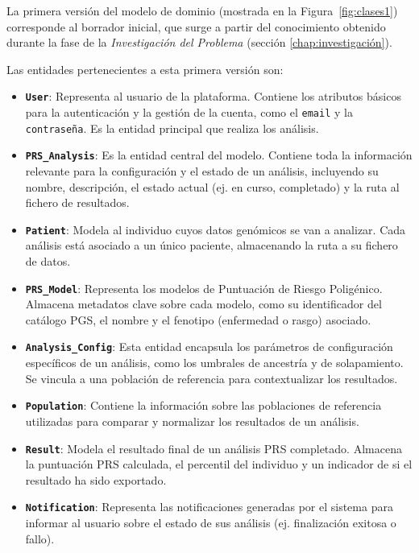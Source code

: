 La primera versión del modelo de dominio (mostrada en la Figura~\ref{fig:clases1}) corresponde al borrador inicial, que surge a partir del conocimiento obtenido durante la fase de la \textit{Investigación del Problema} (sección \ref{chap:investigación}).

Las entidades pertenecientes a esta primera versión son:  

\begin{itemize}
    \item \textbf{\texttt{User}}: Representa al usuario de la plataforma. Contiene los atributos básicos para la autenticación y la gestión de la cuenta, como el \texttt{email} y la \texttt{contraseña}. Es la entidad principal que realiza los análisis.
    
    \item \textbf{\texttt{PRS\_Analysis}}: Es la entidad central del modelo. Contiene toda la información relevante para la configuración y el estado de un análisis, incluyendo su nombre, descripción, el estado actual (ej. en curso, completado) y la ruta al fichero de resultados.
    
    \item \textbf{\texttt{Patient}}: Modela al individuo cuyos datos genómicos se van a analizar. Cada análisis está asociado a un único paciente, almacenando la ruta a su fichero de datos.
    
    \item \textbf{\texttt{PRS\_Model}}: Representa los modelos de Puntuación de Riesgo Poligénico. Almacena metadatos clave sobre cada modelo, como su identificador del catálogo PGS, el nombre y el fenotipo (enfermedad o rasgo) asociado.
    
    \item \textbf{\texttt{Analysis\_Config}}: Esta entidad encapsula los parámetros de configuración específicos de un análisis, como los umbrales de ancestría y de solapamiento. Se vincula a una población de referencia para contextualizar los resultados.
    
    \item \textbf{\texttt{Population}}: Contiene la información sobre las poblaciones de referencia utilizadas para comparar y normalizar los resultados de un análisis.
    
    \item \textbf{\texttt{Result}}: Modela el resultado final de un análisis PRS completado. Almacena la puntuación PRS calculada, el percentil del individuo y un indicador de si el resultado ha sido exportado.
    
    \item \textbf{\texttt{Notification}}: Representa las notificaciones generadas por el sistema para informar al usuario sobre el estado de sus análisis (ej. finalización exitosa o fallo).
\end{itemize}

